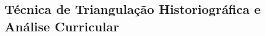 \subsection{Técnica de Triangulação Historiográfica e Análise Curricular}
\label{subsec:metodologia_triangulacao}

